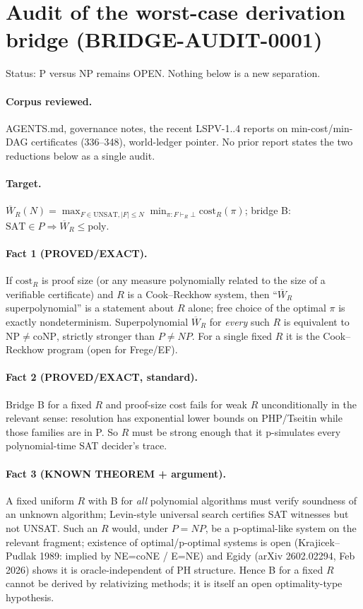 \documentclass{article}
\begin{document}
\section*{Audit of the worst-case derivation bridge (BRIDGE-AUDIT-0001)}
Status: P versus NP remains OPEN. Nothing below is a new separation.

\paragraph{Corpus reviewed.} AGENTS.md, governance notes, the recent LSPV-1..4 reports on min-cost/min-DAG certificates (336--348), world-ledger pointer. No prior report states the two reductions below as a single audit.

\paragraph{Target.} $\overline W_R(N)=\max_{F\in\mathrm{UNSAT},|F|\le N}\min_{\pi:F\vdash_R\bot}\mathrm{cost}_R(\pi)$; bridge B: $\mathrm{SAT}\in P\Rightarrow \overline W_R\le \mathrm{poly}$.

\paragraph{Fact 1 (PROVED/EXACT).} If $\mathrm{cost}_R$ is proof size (or any measure polynomially related to the size of a verifiable certificate) and $R$ is a Cook--Reckhow system, then ``$\overline W_R$ superpolynomial'' is a statement about $R$ alone; free choice of the optimal $\pi$ is exactly nondeterminism. Superpolynomial $\overline W_R$ for \emph{every} such $R$ is equivalent to $\mathrm{NP}\neq\mathrm{coNP}$, strictly stronger than $P\ne NP$. For a single fixed $R$ it is the Cook--Reckhow program (open for Frege/EF).

\paragraph{Fact 2 (PROVED/EXACT, standard).} Bridge B for a fixed $R$ and proof-size cost fails for weak $R$ unconditionally in the relevant sense: resolution has exponential lower bounds on PHP/Tseitin while those families are in P. So $R$ must be strong enough that it p-simulates every polynomial-time SAT decider's trace.

\paragraph{Fact 3 (KNOWN THEOREM + argument).} A fixed uniform $R$ with B for \emph{all} polynomial algorithms must verify soundness of an unknown algorithm; Levin-style universal search certifies SAT witnesses but not UNSAT. Such an $R$ would, under $P=NP$, be a p-optimal-like system on the relevant fragment; existence of optimal/p-optimal systems is open (Krajicek--Pudlak 1989: implied by NE=coNE / E=NE) and Egidy (arXiv 2602.02294, Feb 2026) shows it is oracle-independent of PH structure. Hence B for a fixed $R$ cannot be derived by relativizing methods; it is itself an open optimality-type hypothesis.
\end{document}
